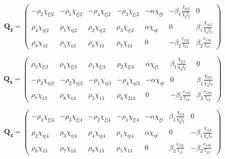 \begin{equation} 
\mathbf{Q_2} =
\begin{pmatrix}
-\rho_2 \chi_{\xi | 2} & -\rho_1 \chi_{\xi | 2} & -\rho_4 \chi_{\xi | 2} & -\rho_3 \chi_{\xi | 2} & -\alpha \chi_{\xi t} & -\beta_1 \frac{\chi_{\xi | 2}}{\bar{\chi_\xi} l_\xi} & 0  \\	
\rho_4 \chi_{\eta | 2} & \rho_1 \chi_{\eta | 2} & \rho_2 \chi_{\eta | 2} & \rho_3 \chi_{\eta | 2} & \alpha \chi_{\eta t} & 0 & \beta_1 \frac{\chi_{\eta | 2}}{\bar{\chi_\eta} l_\eta} \\
\rho_8 \chi_{13} & \rho_5 \chi_{13} & \rho_6 \chi_{13} & \rho_7 \chi_{13} & 0 & -\beta_2 \frac{c_{13 \xi}}{l_{13}} & \beta_2 \frac{c_{13 \eta}}{l_{13}}
\end{pmatrix}		
\label{equation14_2}
\end{equation}

\begin{equation} 
\mathbf{Q_3} =
\begin{pmatrix}
\rho_3 \chi_{\xi | 3} & \rho_4 \chi_{\xi | 3} & \rho_1 \chi_{\xi | 3} & \rho_2 \chi_{\xi | 3} & \alpha \chi_{\xi t} & \beta_1 \frac{\chi_{\xi | 3}}{\bar{\chi_\xi} l_\xi} & 0  \\	
-\rho_3 \chi_{\eta | 3} & -\rho_2 \chi_{\eta | 3} & -\rho_1 \chi_{\eta | 3} & -\rho_4 \chi_{\eta | 3} & -\alpha \chi_{\eta t} & 0 & \beta_1 \frac{\chi_{\eta | 3}}{\bar{\chi_\eta} l_\eta} \\
\rho_7 \chi_{13} & \rho_8 \chi_{13} & \rho_5 \chi_{13} & \rho_6 \chi_{213} & 0 & -\beta_2 \frac{c_{13 \xi}}{l_{13}} & \beta_2 \frac{c_{13 \eta}}{l_{13}}
\end{pmatrix}		
\label{equation14_3}
\end{equation}

\begin{equation} 
\mathbf{Q_4} =
\begin{pmatrix}
-\rho_4 \chi_{\xi | 4} & -\rho_3 \chi_{\xi | 4} & -\rho_2 \chi_{\xi | 4} & -\rho_1 \chi_{\xi | 4} & -\alpha \chi_{\xi t} & \beta_1 \frac{\chi_{\xi | 4}}{\bar{\chi_\xi} l_\xi} & 0  \\	
\rho_2 \chi_{\eta | 4} & \rho_3 \chi_{\eta | 4} & \rho_4 \chi_{\eta | 4} & \rho_1 \chi_{\eta | 4} & \alpha \chi_{\eta t} & 0 & -\beta_1 \frac{\chi_{\eta | 4}}{\bar{\chi_\eta} l_\eta} \\
\rho_6 \chi_{13} & \rho_7 \chi_{13} & \rho_8 \chi_{13} & \rho_5 \chi_{13} & 0 & \beta_2 \frac{c_{13 \xi}}{l_{13}} & -\beta_2 \frac{c_{13 \eta}}{l_{13}}
\end{pmatrix}		
\label{equation15}
\end{equation}

